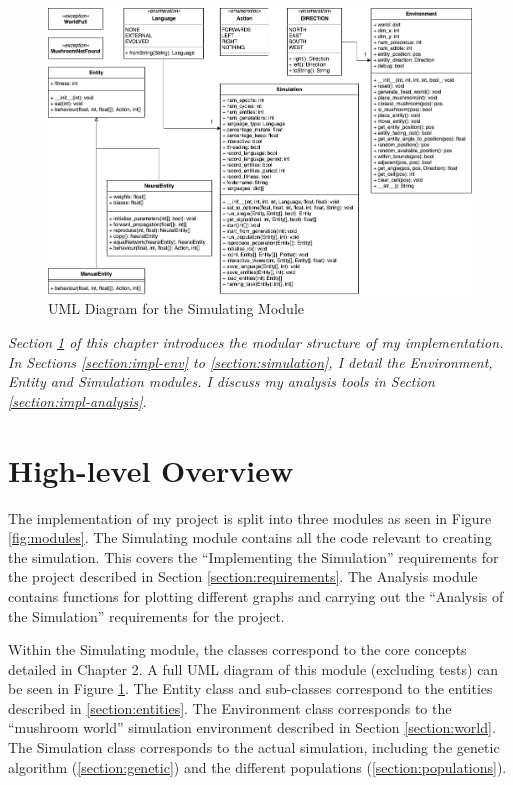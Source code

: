 \documentclass[12pt,a4paper,twoside,openright]{report}
\begin{document}
\begin{figure}[t]
  \centering
  \includegraphics[width=1.\linewidth]{figs/uml}
  \caption{UML Diagram for the Simulating Module}
  \label{fig:uml}
\end{figure}


\emph{Section \ref{section:impl-high} of this chapter introduces the modular structure of my implementation. In Sections \ref{section:impl-env} to \ref{section:simulation}, I detail the Environment, Entity and Simulation modules. I discuss my analysis tools in Section \ref{section:impl-analysis}}.

\section{High-level Overview}\label{section:impl-high}

The implementation of my project is split into three modules as seen in Figure \ref{fig:modules}. The Simulating module contains all the code relevant to creating the simulation. This covers the ``Implementing the Simulation'' requirements for the project described in Section \ref{section:requirements}. The Analysis module contains functions for plotting different graphs and carrying out the ``Analysis of the Simulation'' requirements for the project.

Within the Simulating module, the classes correspond to the core concepts detailed in Chapter 2. A full UML diagram of this module (excluding tests) can be seen in Figure \ref{fig:uml}. The Entity class and sub-classes correspond to the entities described in \ref{section:entities}. The Environment class corresponds to the ``mushroom world'' simulation environment described in Section \ref{section:world}. The Simulation class corresponds to the actual simulation, including the genetic algorithm (\ref{section:genetic}) and the different populations (\ref{section:populations}).
\end{document}
